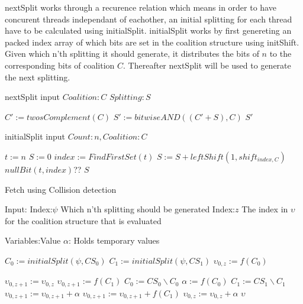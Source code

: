 \documentclass{aamas2012}
\begin{document}
nextSplit works through a recurence relation which means in order to have 
concurent threads independant of eachother, an initial splitting for each thread have to be calculated using initialSplit. 
initialSplit works by first genereting an packed index array of which bits are set in the coalition structure using initShift.
Given which n'th splitting it should generate, it distributes the bits of $n$ to the corresponding bits of coalition $C$. 
Thereafter nextSplit will be used to generate the next splitting. 




\begin{algorithm}
\caption{ nextSplit input $Coalition:C$ $Splitting:S$}
\begin{algorithmic}[1]
\STATE $C' := twosComplement(C)$
\STATE $S' := bitwiseAND((C'+S),C)$
\RETURN $S'$
\end{algorithmic}
\end{algorithm}

\begin{algorithm}
\caption{initialSplit input $Count:n, Coalition:C$}
\begin{algorithmic}[1]
\STATE $t := n$
\STATE $S := 0$
 {
\STATE $index := FindFirstSet(t)$
\STATE $S := S + leftShift(1,shift_{index,C})$
\STATE $nullBit(t,index)$??
}
\ENDWHILE
\RETURN $S$
\end{algorithmic}
\end{algorithm}

\begin{algorithm}
\caption{Fetch using Collision detection \label{collision}}
Input:
Index:$\psi$ \hfill Which n'th splitting should be generated
Index:$z$ \hfill The index in $\upsilon$ for the coalition structure that is evaluated 

Variables:Value $\alpha $: \hfill Holds temporary values

\begin{algorithmic}[1]
    \STATE $C_{0} := initialSplit(\psi,CS_0)$ \label{lst:line:startcol}
    \STATE $C_{1} := initialSplit(\psi,CS_1)$
    \STATE $\upsilon_{0,z} := f(C_{0})$ \label{lst:line:fetch}
    
     \label{lst:line:firstif}
      \STATE $\upsilon_{0,z+1} := \upsilon_{0,z}$
      \ELSE
      \STATE $\upsilon_{0,z+1} := f(C_{1})$
     \ENDIF \label{lst:line:firstifend}
    \STATE $C_{0} := CS_0\backslash C_{0}$ \label{lst:line:startend}
    \STATE $\alpha := f(C_{0})$
    \STATE $C_{1} := CS_1\backslash C_{1}$
      \STATE $\upsilon_{0,z+1} := \upsilon_{0,z+1}  + \alpha$
    \ELSE
      \STATE $\upsilon_{0,z+1} := \upsilon_{0,z+1} + f(C_{1})$
    \ENDIF
    \STATE $\upsilon_{0,z} := \upsilon_{0,z}  + \alpha$ \label{lst:line:endend}
\RETURN $\upsilon$
\end{algorithmic}
\end{algorithm}
\end{document}
